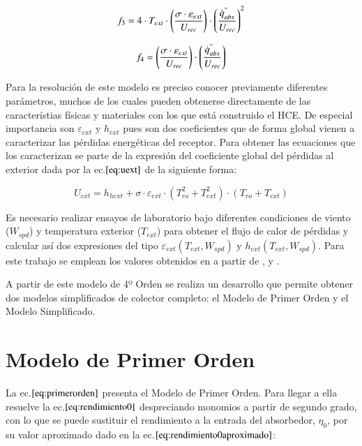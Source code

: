 \documentclass[12pt]{report} %
\begin{document}
\begin{equation}
    f_{3} = 4 \cdot T_{ext} \cdot \left(\frac{\sigma \cdot \varepsilon_{ext}}{U_{rec}} \right) \cdot \left(\frac{\dot{q}^{"}_{abs}}{U_{rec}}\right)^{2} 
    \label{eq:f3}
\end{equation}

\begin{equation}
    f_{4} = \left(\frac{\sigma \cdot \varepsilon_{ext}}{U_{rec}} \right) \cdot \left(\frac{\dot{q}^{"}_{abs}}{U_{rec}}\right) 
    \label{eq:f4}
\end{equation}

Para la resolución de este modelo es preciso conocer previamente diferentes parámetros, muchos de los cuales pueden obtenerse directamente de las característias físicas y materiales con los que está construido el HCE. De especial importancia son \(\varepsilon_{ext}\) y \(h_{ext}\) pues son dos coeficientes que de forma global vienen a caracterizar las pérdidas energéticas del receptor. Para obtener las ecuaciones que los caracterizan se parte de la expresión del coeficiente global del pérdidas al exterior dada por la ec.\(\eqref{eq:uext}\) de la siguiente forma:

\begin{equation}
    U_{ext} = h_{hext} + \sigma \cdot \varepsilon_{ext} \cdot \left(T_{ro}^2 + T_{ext}^2 \right) \cdot \left(T_{ro} + T_{ext} \right)
    \label{eq:uext}
\end{equation}

Es necesario realizar ensayos de laboratorio bajo diferentes condiciones de viento (\(W_{spd}\)) y temperatura exterior (\(T_{ext}\)) para obtener el flujo de calor de pérdidas y calcular así dos expresiones del tipo \(\varepsilon_{ext}(T_{ext},W_{spd})\) y \(h_{ext}(T_{ext},W_{spd})\). Para este trabajo se emplean los valores obtenidos en \cite{barberofresnoDesarrolloModeloTeorico2018} a partir de \cite{burkholderHeatLossTestingSolel2008}, \cite{burkholderHeatLossTesting2009} y \cite{kutscherGenerationParabolicTrough2012}.

A partir de este modelo de 4º Orden se realiza un desarrollo que permite obtener dos modelos simplificados de colector completo: el Modelo de Primer Orden y el Modelo Simplificado.

\section{Modelo de Primer Orden}

La ec.\(\eqref{eq:primerorden}\) presenta el Modelo de Primer Orden. Para llegar a ella resuelve la ec.\(\eqref{eq:rendimiento0}\) despreciando monomios a partir de segundo grado, con lo que se puede sustituir el rendimiento a la entrada del absorbedor, \(\eta_{0}\), por su valor aproximado dado en la ec.\(\eqref{eq:rendimiento0aproximado}\):
\end{document}
